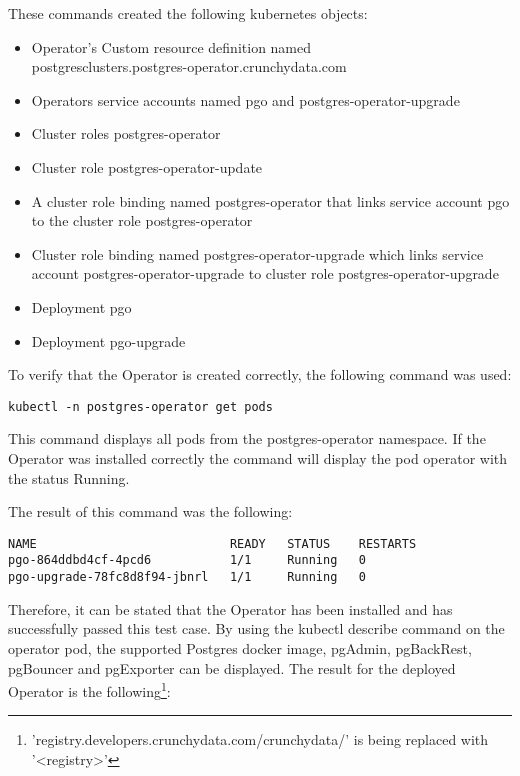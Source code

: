 These commands created the following kubernetes objects:
\begin{itemize}
  \item Operator's Custom resource definition named \\postgresclusters.postgres-operator.crunchydata.com
  \item Operators service accounts named pgo and postgres-operator-upgrade
  \item Cluster roles postgres-operator
  \item Cluster role postgres-operator-update
  \item A cluster role binding named postgres-operator that links service account pgo to the cluster role postgres-operator
  \item Cluster role binding named postgres-operator-upgrade which links service account postgres-operator-upgrade to cluster role postgres-operator-upgrade
  \item Deployment pgo
  \item Deployment pgo-upgrade
\end{itemize}


To verify that the Operator is created correctly, the following command was used:
\begin{verbatim}
kubectl -n postgres-operator get pods
\end{verbatim}

This command displays all pods from the postgres-operator namespace. If the Operator was installed correctly the command will display the pod operator with the status Running.

The result of this command was the following:
\begin{verbatim}
NAME                           READY   STATUS    RESTARTS
pgo-864ddbd4cf-4pcd6           1/1     Running   0
pgo-upgrade-78fc8d8f94-jbnrl   1/1     Running   0 
\end{verbatim}

Therefore, it can be stated that the Operator has been installed and has successfully passed this test case.
\label{chap:pgoclusterinstall}
By using the kubectl describe command on the operator pod, the supported Postgres docker image, pgAdmin, pgBackRest, pgBouncer and pgExporter can be displayed. The result for the deployed Operator is the following\footnote{'registry.developers.crunchydata.com/crunchydata/' is being replaced with '<registry>'}:

